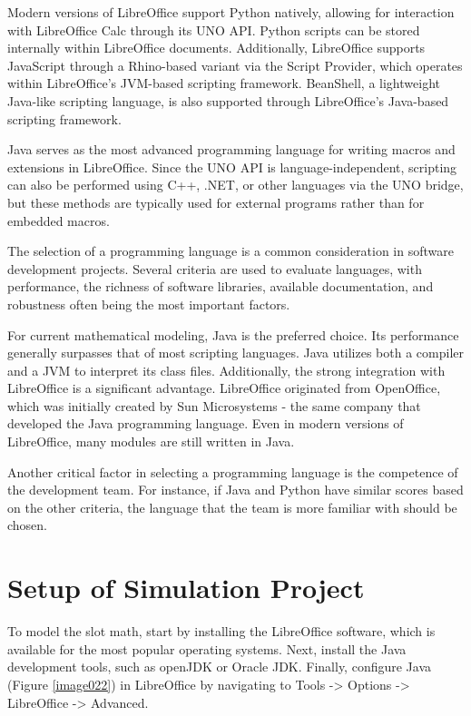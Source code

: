 \documentclass[12pt,twoside,openany]{book}
\begin{document}
Modern versions of LibreOffice support Python natively, allowing for interaction with LibreOffice Calc through its UNO API. Python scripts can be stored internally within LibreOffice documents. Additionally, LibreOffice supports JavaScript through a Rhino-based variant via the Script Provider, which operates within LibreOffice’s JVM-based scripting framework. BeanShell, a lightweight Java-like scripting language, is also supported through LibreOffice’s Java-based scripting framework.

Java serves as the most advanced programming language for writing macros and extensions in LibreOffice. Since the UNO API is language-independent, scripting can also be performed using C++, .NET, or other languages via the UNO bridge, but these methods are typically used for external programs rather than for embedded macros.

The selection of a programming language is a common consideration in software development projects. Several criteria are used to evaluate languages, with performance, the richness of software libraries, available documentation, and robustness often being the most important factors.

For current mathematical modeling, Java is the preferred choice. Its performance generally surpasses that of most scripting languages. Java utilizes both a compiler and a JVM to interpret its class files. Additionally, the strong integration with LibreOffice is a significant advantage. LibreOffice originated from OpenOffice, which was initially created by Sun Microsystems - the same company that developed the Java programming language. Even in modern versions of LibreOffice, many modules are still written in Java.

Another critical factor in selecting a programming language is the competence of the development team. For instance, if Java and Python have similar scores based on the other criteria, the language that the team is more familiar with should be chosen.

\chapter{Setup of Simulation Project}

To model the slot math, start by installing the LibreOffice software, which is available for the most popular operating systems. Next, install the Java development tools, such as openJDK or Oracle JDK. Finally, configure Java (Figure \ref{image022}) in LibreOffice by navigating to Tools -> Options -> LibreOffice -> Advanced.
\end{document}
